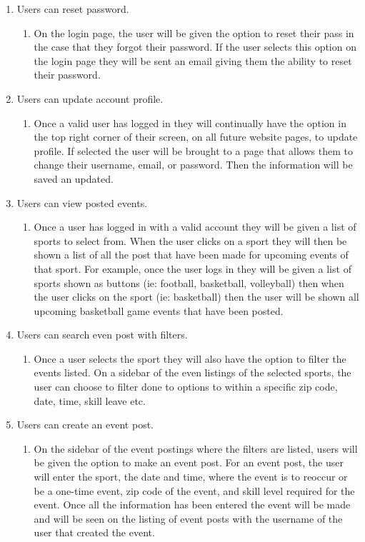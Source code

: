 \documentclass[a4paper]{article}
\begin{document}
\begin{enumerate}
\item Users can reset password.
\begin{enumerate}
\item On the login page, the user will be given the option to reset their pass in the case that they forgot their password. If the user selects this option on the login page they will be sent an email giving them the ability to reset their password.
\end{enumerate}

\item Users can update account profile.
\begin{enumerate}
\item Once a valid user has logged in they will continually have the option in the top right corner of their screen, on all future website pages, to update profile. If selected the user will be brought to a page that allows them to change their username, email, or password. Then the information will be saved an updated.
\end{enumerate}

\item Users can view posted events.
\begin{enumerate}
\item Once a user has logged in with a valid account they will be given a list of sports to select from. When the user clicks on a sport they will then be shown a list of all the post that have been made for upcoming events of that sport. For example, once the user logs in they will be given a list of sports shown as buttons (ie: football, basketball, volleyball) then when the user clicks on the sport (ie: basketball) then the user will be shown all upcoming basketball game events that have been posted.
\end{enumerate}

\item Users can search even post with filters.
\begin{enumerate}
\item Once a user selects the sport they will also have the option to filter the events listed. On a sidebar of the even listings of the selected sports, the user can choose to filter done to options to within a specific zip code, date, time, skill leave etc.
\end{enumerate}

\newpage
\item Users can create an event post.
\begin{enumerate}
\item On the sidebar of the event postings where the filters are listed, users will be given the option to make an event post. For an event post, the user will enter the sport, the date and time, where the event is to reoccur or be a one-time event, zip code of the event, and skill level required for the event. Once all the information has been entered the event will be made and will be seen on the listing of event posts with the username of the user that created the event.    
\end{enumerate}


\end{enumerate}
\end{document}
